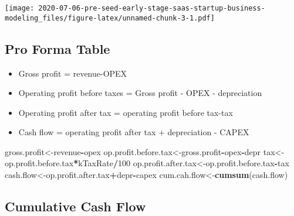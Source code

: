 \documentclass[
]{article}
\newenvironment{Shaded}{\begin{snugshade}}{\end{snugshade}}
\newcommand{\DataTypeTok}[1]{\textcolor[rgb]{0.13,0.29,0.53}{#1}}
\newcommand{\DecValTok}[1]{\textcolor[rgb]{0.00,0.00,0.81}{#1}}
\newcommand{\KeywordTok}[1]{\textcolor[rgb]{0.13,0.29,0.53}{\textbf{#1}}}
\newcommand{\NormalTok}[1]{#1}
\newcommand{\OperatorTok}[1]{\textcolor[rgb]{0.81,0.36,0.00}{\textbf{#1}}}
\newcommand{\StringTok}[1]{\textcolor[rgb]{0.31,0.60,0.02}{#1}}
\providecommand{\tightlist}{%
  \setlength{\itemsep}{0pt}\setlength{\parskip}{0pt}}
\begin{document}
\texttt{[image: 2020-07-06-pre-seed-early-stage-saas-startup-business-modeling\_files/figure-latex/unnamed-chunk-3-1.pdf]}

\hypertarget{pro-forma-table}{%
\subsection{Pro Forma Table}\label{pro-forma-table}}

\begin{itemize}
\tightlist
\item
  Gross profit = revenue-OPEX
\item
  Operating profit before taxes = Gross profit - OPEX - depreciation
\item
  Operating profit after tax = operating profit before tax-tax
\item
  Cash flow = operating profit after tax + depreciation - CAPEX
\end{itemize}

\begin{Shaded}
\begin{Highlighting}[]
\NormalTok{gross.profit<-revenue}\OperatorTok{-}\NormalTok{opex}
\NormalTok{op.profit.before.tax<-gross.profit}\OperatorTok{-}\NormalTok{opex}\OperatorTok{-}\NormalTok{depr}
\NormalTok{tax<-op.profit.before.tax}\OperatorTok{*}\NormalTok{kTaxRate}\OperatorTok{/}\DecValTok{100}
\NormalTok{op.profit.after.tax<-op.profit.before.tax}\OperatorTok{-}\NormalTok{tax}
\NormalTok{cash.flow<-op.profit.after.tax}\OperatorTok{+}\NormalTok{depr}\OperatorTok{-}\NormalTok{capex}
\NormalTok{cum.cah.flow<-}\KeywordTok{cumsum}\NormalTok{(cash.flow)}
\end{Highlighting}
\end{Shaded}

\hypertarget{cumulative-cash-flow}{%
\subsection{Cumulative Cash Flow}\label{cumulative-cash-flow}}

\begin{Shaded}
\end{Shaded}
\end{document}
